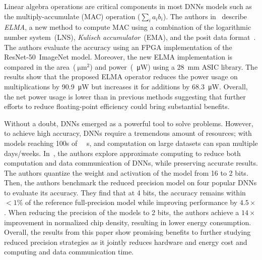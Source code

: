 Linear algebra operations are critical components in most DNNs models such as
the multiply-accumulate (MAC) operation ($\sum_{i}a_{i}b_{i}$).
The authors in~\cite{Johnson2018-up} describe \textit{ELMA}, a new method to compute MAC using a combination of the logarithmic
number system~(LNS), \textit{Kulisch accumulator}~(EMA), and the posit data format~\cite{Gustafson2017-wo}.
The authors evaluate the accuracy using an FPGA implementation of the ResNet-50~ImageNet model.
Moreover, the new ELMA implementation is compared in the area~($\SI{}{\micro\metre}^2$)
and power~(\SI{}{\micro\watt}) using a \SI{28}{\milli\metre} ASIC library.
The results show that the proposed ELMA operator reduces the power usage on
multiplications by \SI{90.9}{\micro\watt} but increases it for additions by \SI{68.3}{\micro\watt}.
Overall, the net power usage is lower than in previous methods suggesting that
further efforts to reduce floating-point efficiency could bring substantial benefits.

Without a doubt, DNNs emerged as a powerful tool to solve problems.
However, to achieve high accuracy, DNNs require a tremendous amount of resources;
with models reaching 100s of \SI{}{\mega\byte}s, and computation on large datasets can span multiple days/weeks.
In~\cite{Chen2018-an}, the authors explore approximate computing to reduce both 
computation and data communication of DNNs, while preserving accurate results.
The authors quantize the weight and activation of the model from 16 to 2 bits.
Then, the authors benchmark the reduced precision model on four popular DNNs to evaluate its accuracy.
They find that at 4 bits, the accuracy remains within $<1\%$ of the reference
full-precision model while improving performance by $4.5\times$.
When reducing the precision of the models to 2 bits, the authors achieve a $14\times$
improvement in normalized chip density, resulting in lower energy consumption.
Overall, the results from this paper show promising benefits to further studying
reduced precision strategies as it jointly reduces hardware and energy cost and
computing and data communication time. 

